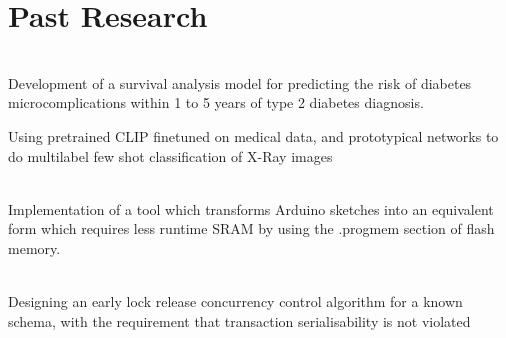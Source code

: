 \documentclass[]{deedy-resume-openfont}
\begin{document}
\begin{minipage}[t]{0.66\textwidth}


\section{Past Research}
\\
Development of a survival analysis model for predicting the risk of diabetes microcomplications within 1 to 5 years of type 2 diabetes diagnosis.
\sectionsep

Using pretrained CLIP finetuned on medical data, and prototypical networks to do multilabel few shot classification of X-Ray images
\sectionsep

\\
Implementation of a tool which transforms Arduino sketches into an equivalent form which requires less runtime SRAM by using the .progmem section of flash memory.
\sectionsep

\\
Designing an early lock release concurrency control algorithm for a known schema, with the requirement that transaction serialisability is not violated

\sectionsep



%
%

\end{minipage}
\end{document}
